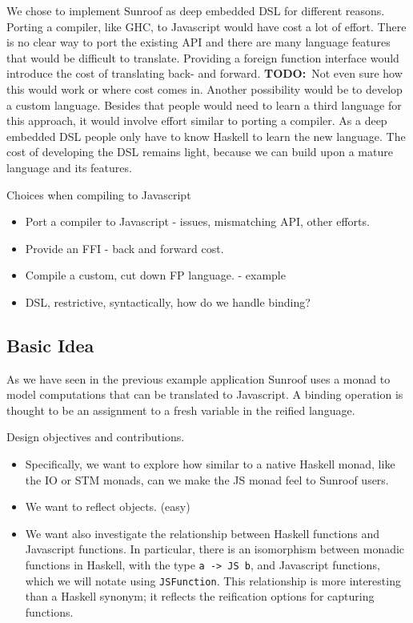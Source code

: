 \documentclass{llncs}
\newcommand{\TODO}[1]{{\textbf{TODO:}\ #1}}
\begin{document}
We chose to implement Sunroof as deep embedded DSL for different
reasons. Porting a compiler, like GHC, to Javascript would have
cost a lot of effort. There is no clear way to port the existing
API and there are many language features that would be difficult to
translate. Providing a foreign function interface would 
introduce the cost of translating back- and forward. 
\TODO{Not even sure how this would work or where cost comes in.}
Another possibility would be to develop a custom language. 
Besides that people would need to learn a third language for this 
approach, it would involve effort similar to porting a compiler.
As a deep embedded DSL people only have to know Haskell to learn
the new language. The cost of developing the DSL remains light, 
because we can build upon a mature language and its features.

Choices when compiling to Javascript
\begin{itemize}
\item Port a compiler to Javascript - issues, mismatching API, other efforts.
\item Provide an FFI - back and forward cost.
\item Compile a custom, cut down FP language. - example
\item DSL, restrictive, syntactically, how do we handle binding?
\end{itemize}

\subsection{Basic Idea}

As we have seen in the previous example application Sunroof uses a 
monad to model computations that can be translated to Javascript.
A binding operation is thought to be an assignment to 
a fresh variable in the reified language.



Design objectives and contributions.
\begin{itemize}
\item 
Specifically, we want to explore how similar to a native Haskell monad,
like the IO or STM monads, can we make the JS monad feel to Sunroof users.
\item We want to reflect objects. (easy)

\item We want also investigate the relationship between Haskell functions
and Javascript functions. In particular, there is an isomorphism
between monadic functions in Haskell, with the type \verb|a -> JS b|,
and Javascript functions, which we will notate using \verb|JSFunction|.
This relationship is more interesting than a Haskell synonym;
it reflects the reification options for capturing functions.
\end{itemize}
\end{document}
